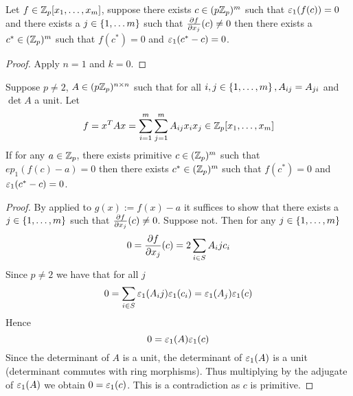 \begin{cor}[Hensel]
    Let $f \in \mathbb{Z}_p [x_1,\dots,x_m]$, 
    suppose there exists $c \in (p \mathbb{Z}_p)^m$
    such that $\varepsilon_1(f(c)) = 0$ and 
    there exists a $j \in \left\{1,\dots m\right\}$
    such that $\frac{\partial f}{\partial x_j}(c) \ne 0$
    then there exists a $c^* \in (\mathbb{Z}_p)^m$ 
    such that $f(c^*) = 0$ and 
    $\varepsilon_1(c^* - c) = 0$.
\end{cor}
\begin{proof}
    Apply 
    $n = 1$ and $k = 0$.
\end{proof}

\begin{cor}
    Suppose $p \ne 2$, 
    $A \in (p\mathbb{Z}_p)^{n \times n}$
    such that for all 
    $i,j \in \left\{1,\dots,m\right\}, A_{ij} = A_{ji}$
    and $\det A$ a unit. 
    Let
    \[
        f = x^T A x = 
        \sum_{i = 1}^m \sum_{j = 1}^m A_{ij} x_i x_j
        \in \mathbb{Z}_p[x_1,\dots,x_m]
    \]
    If for any $a \in \mathbb{Z}_p$,
    there exists primitive $c \in (\mathbb{Z}_p)^m$
    such that $ep_1(f(c) - a) = 0$
    then there exists $c^* \in (\mathbb{Z}_p)^m$
    such that $f(c^*) = 0$ and $\varepsilon_1(c^* - c) = 0$.   
\end{cor}
\begin{proof}
    By  applied to $g(x) := f(x) - a$
    it suffices to show that
    there exists a $j \in \left\{1,\dots, m\right\}$ such that 
    $\frac{\partial f}{\partial x_j}(c) \ne 0$.
    Suppose not.
    Then for any $j \in \left\{1,\dots, m\right\}$
    \[0 = \frac{\partial f}{\partial x_j}(c) = 2 \sum_{i \in S} A_ij c_i\]
    Since $p \ne 2$ we have that for all $j$
    \[0 = \sum_{i \in S} \varepsilon_1(A_ij) \varepsilon_1(c_i) = 
    \varepsilon_1 (A_j) \varepsilon_1(c)\]
    Hence \[0 = \varepsilon_1 (A) \varepsilon_1 (c)\]
    Since the determinant of $A$ is a unit,
    the determinant of $\varepsilon_1 (A)$ is a unit
    (determinant commutes with ring morphisms).
    Thus multiplying by the adjugate of $\varepsilon_1 (A)$ 
    we obtain $0 = \varepsilon_1(c)$.
    This is a contradiction as $c$ is primitive.
\end{proof}

